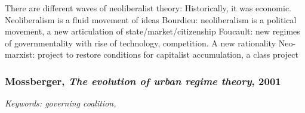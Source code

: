 \documentclass{article}
\begin{document}
\begin{outline}
	\1 There are different waves of neoliberalist theory:
		\2 Historically, it was economic. Neoliberalism is a fluid movement of ideas
		\2 Bourdieu: neoliberalism is a political movement, a new articulation of state/market/citizenship
		\2 Foucault: new regimes of governmentality with rise of technology, competition. A new rationality
		\2 Neo-marxist: project to restore conditions for capitalist accumulation, a class project
\end{outline}

\subsubsection{Mossberger, \textit{The evolution of urban regime theory}, 2001}

\textit{Keywords: governing coalition, }
\end{document}
